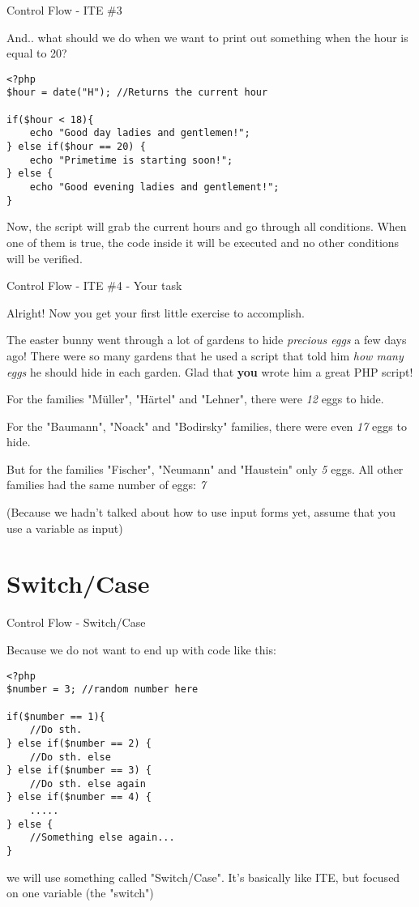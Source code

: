 \begin{frame}[fragile]{Control Flow - ITE \#{}3}

And.. what should we do when we want to print out something when the hour is equal to 20? \pause
\begin{lstlisting}
<?php
$hour = date("H"); //Returns the current hour

if($hour < 18){
	echo "Good day ladies and gentlemen!";
} else if($hour == 20) {
    echo "Primetime is starting soon!";
} else {
    echo "Good evening ladies and gentlement!";
}
\end{lstlisting} 
\pause

Now, the script will grab the current hours and go through all conditions. When one of them is true, the code inside it will be executed and no other conditions will be verified.
\end{frame}

\begin{frame}[fragile]{Control Flow - ITE \#{}4 - Your task}

Alright! Now you get your first little exercise to accomplish. \pause

The easter bunny went through a lot of gardens to hide \emph{precious eggs} a few days ago! There were so many gardens that he used a script that told him \emph{how many eggs} he should hide in each garden. Glad that \textbf{you} wrote him a great PHP script!

For the families "Müller", "Härtel" and "Lehner", there were \emph{12} eggs to hide. 

For the "Baumann", "Noack" and "Bodirsky" families, there were even \emph{17} eggs to hide.

But for the families "Fischer", "Neumann" and "Haustein" only \emph{5} eggs. All other families had the same number of eggs: \emph{7}

(Because we hadn't talked about how to use input forms yet, assume that you use a variable as input) 
\end{frame}

\section{Switch/Case}

\begin{frame}[fragile]{Control Flow - Switch/Case}

Because we do not want to end up with code like this:
\begin{lstlisting}
<?php
$number = 3; //random number here

if($number == 1){
	//Do sth.
} else if($number == 2) {
    //Do sth. else 
} else if($number == 3) {
    //Do sth. else again
} else if($number == 4) {
    .....
} else {
    //Something else again...
}
\end{lstlisting} 
\pause

we will use something called "Switch/Case". It's basically like ITE, but focused on one variable (the "switch")

\end{frame}

